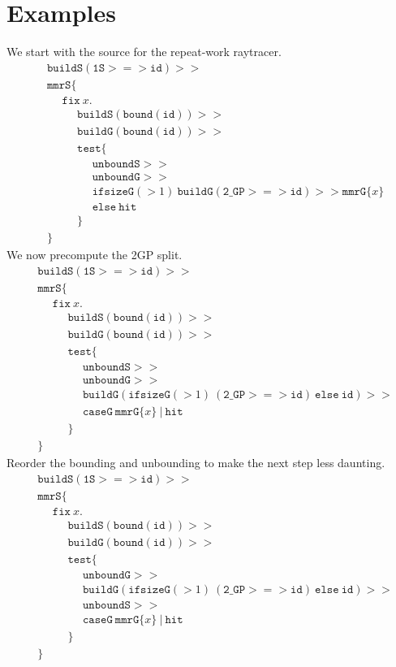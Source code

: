 \documentclass{article}
\newcommand {\fix}{\mathtt{fix}}
\newcommand {\test}{\mathtt{test}}
\newcommand {\isect}{\mathtt{hit}}
\newcommand {\buildG}{\mathtt{buildG}}
\newcommand {\buildS}{\mathtt{buildS}}
\newcommand {\id}{\mathtt{id}}
\newcommand {\unboundG}{\mathtt{unboundG}}
\newcommand {\unboundS}{\mathtt{unboundS}}
\newcommand {\mmrG}{\mathtt{mmrG}}
\newcommand {\mmrS}{\mathtt{mmrS}}
\newcommand {\oneS}{\mathtt{1S}}
\newcommand {\twoGP}{\mathtt{2\_GP}}
\newcommand {\bound}{\mathtt{bound}}
\newcommand {\normalSpacing}{\setlength{\jot}{1ex}}
\newcommand {\tab}{~~~~~~}
\begin{document}
\section{Examples}
\normalSpacing
We start with the source for the repeat-work raytracer.
\begin{align*}
&\buildS (\oneS >=> \id) >> \\
&\mmrS \{ \\
&\tab\fix~x. \\
&\tab\tab \buildS(\bound (\mathtt{id})) >> \\
&\tab\tab \buildG(\bound (\mathtt{id})) >> \\
&\tab\tab\test \{ \\
&\tab\tab\tab \unboundS >> \\
&\tab\tab\tab \unboundG >> \\
&\tab\tab\tab \mathtt{ifsizeG}(>1)~\buildG (\twoGP >=> \id) >> \mmrG \{x\} \\
&\tab\tab\tab \mathtt{else}~\isect \\
&\tab \tab \} \\
&\}
\end{align*}
We now precompute the 2GP split.
\begin{align*}
&\buildS (\oneS >=> \id) >> \\
&\mmrS \{ \\
&\tab\fix~x. \\
&\tab\tab \buildS(\bound (\mathtt{id})) >> \\
&\tab\tab \buildG(\bound (\mathtt{id})) >> \\
&\tab\tab\test \{ \\
&\tab\tab\tab \unboundS >> \\
&\tab\tab\tab \unboundG >> \\
&\tab\tab\tab \buildG (\mathtt{ifsizeG}(>1)~(\twoGP >=> \id)~\mathtt{else}~\id) >> \\
&\tab\tab\tab \mathtt{caseG}~\mmrG \{x\}~|~\isect\\
&\tab \tab \} \\
&\}
\end{align*}
Reorder the bounding and unbounding to make the next step less daunting.
\begin{align*}
&\buildS (\oneS >=> \id) >> \\
&\mmrS \{ \\
&\tab\fix~x. \\
&\tab\tab \buildS(\bound (\mathtt{id})) >> \\
&\tab\tab \buildG(\bound (\mathtt{id})) >> \\
&\tab\tab\test \{ \\
&\tab\tab\tab \unboundG >> \\
&\tab\tab\tab \buildG (\mathtt{ifsizeG}(>1)~(\twoGP >=> \id)~\mathtt{else}~\id) >> \\
&\tab\tab\tab \unboundS >> \\
&\tab\tab\tab \mathtt{caseG}~\mmrG \{x\}~|~\isect\\
&\tab \tab \} \\
&\}
\end{align*}
\end{document}

